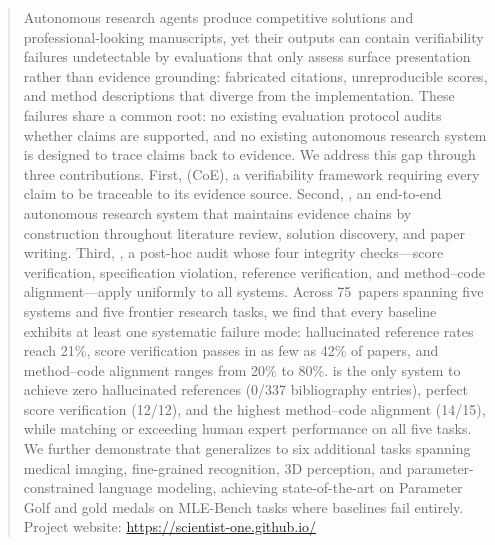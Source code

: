 
\begin{abstract}
Autonomous research agents produce competitive solutions and professional-looking manuscripts, yet their outputs can contain verifiability failures undetectable by evaluations that only assess surface presentation rather than evidence grounding: fabricated citations, unreproducible scores, and method descriptions that diverge from the implementation.
These failures share a common root: no existing evaluation protocol audits whether claims are supported, and no existing autonomous research system is designed to trace claims back to evidence.
We address this gap through three contributions. First, \emph{\coe{}} (CoE), a verifiability framework requiring every claim to be traceable to its evidence source. Second, \sys{}, an end-to-end autonomous research system that maintains evidence chains by construction throughout literature review, solution discovery, and paper writing. Third, \emph{\coeaudit{}}, a post-hoc audit whose four integrity checks---score verification, specification violation, reference verification, and method--code alignment---apply uniformly to all systems.
Across 75~papers spanning five systems and five frontier research tasks, we find that every baseline exhibits at least one systematic failure mode: hallucinated reference rates reach 21\%, score verification passes in as few as 42\% of papers, and method--code alignment ranges from 20\% to 80\%.
\sys{} is the only system to achieve zero hallucinated references (0/337 bibliography entries), perfect score verification (12/12), and the highest method--code alignment (14/15), while matching or exceeding human expert performance on all five tasks.
We further demonstrate that \sys{} generalizes to six additional tasks spanning medical imaging, fine-grained recognition, 3D perception, and parameter-constrained language modeling, achieving state-of-the-art on Parameter Golf and gold medals on MLE-Bench tasks where baselines fail entirely.
Project website: \url{https://scientist-one.github.io/}
\end{abstract}
